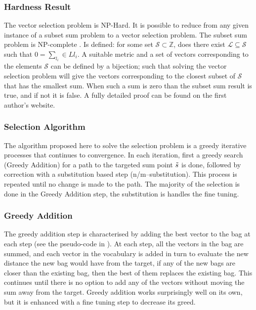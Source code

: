 \documentclass[11pt]{article}
\numberwithin{equation}{section}
\numberwithin{figure}{section}
\theoremstyle{plain}
\theoremstyle{definition}
\begin{document}
\subsubsection{Hardness Result}
The vector selection problem is NP-Hard. It is possible to reduce from any given instance of a subset sum problem to a vector selection problem. The subset sum problem is NP-complete \textcite{karp1972reducibility}. Is defined: for some set $\mathcal{S}\subset\mathbb{Z}$, does there exist $\mathcal{L}\subseteq\mathcal{S}$ such that $0=\sum_{l_i}\in L l_i$.  A suitable metric and a set of vectors corresponding to the elements $\mathcal{S}$ can be defined by a bijection; such that solving the vector selection problem will give the vectors corresponding to the closest subset of $\mathcal{S}$ that has the smallest sum. When such a sum is zero than the subset sum result is true, and if not it is false. A fully detailed proof can be found on the first author's website.

\subsubsection{Selection Algorithm}
The algorithm proposed here to solve the selection problem is a greedy iterative processes that continues to convergence. In each iteration, first a greedy search (Greedy Addition) for a path to the targeted sum point $\tilde{s}$ is done, followed by correction with a substitution based step (n/m--substitution). This process is repeated until no change is made to the path. The majority of the selection is done in the Greedy Addition step, the substitution is handles the fine tuning.

\subsubsection{Greedy Addition}
The greedy addition step is characterised by adding the best vector to the bag at each step (see the pseudo-code in ). At each step, all the vectors in the bag are summed, and each vector in the vocabulary is added in turn to evaluate the new distance the new bag would have from the target, if any of the new bags are closer than the existing bag, then the best of them replaces the existing bag. This continues until there is no option to add any of the vectors without moving the sum away from the target. Greedy addition works surprisingly well on its own, but it is enhanced with a fine tuning step to decrease its greed.
\end{document}
